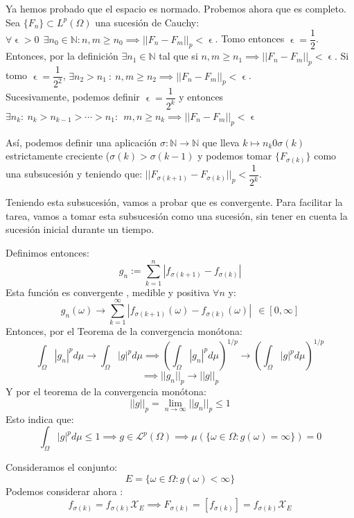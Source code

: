 \documentclass[11pt, a4paper]{article}
\makeatletter
\newif\IfInSansMode
\let\oldsf\sffamily
\renewcommand*{\sffamily}{\oldsf\mathversion{sans}\InSansModetrue}
\let\oldnorm\normalfont
\renewcommand*{\normalfont}{\oldnorm\InSansModefalse\mathversion{normal}}
\let\epsilon\upvarepsilon
\renewenvironment{proof}[1][\proofname] {\par\pushQED{\qed}\normalfont\topsep6\p@\@plus6\p@\relax\trivlist\item[\hskip\labelsep\itshape\sffamily#1\@addpunct{.}]\ignorespaces}{\popQED\endtrivlist\@endpefalse}
\theoremstyle{theorem-style}
\theoremstyle{definition-style}
\theoremstyle{remark-style}
\theoremstyle{example-style}
\makeatother
\begin{document}
\begin{proof}
  Ya hemos probado que el espacio es normado. Probemos ahora que es completo.\\
  
  Sea $\{ F_n\} \subset L^p(\Omega)$ una sucesión de Cauchy: $\forall \epsilon > 0 \ \ \exists n_0 \in \mathbb N : n,m \geq n_0 \implies || F_n - F_m ||_p < \epsilon$.
  Tomo entonces $\epsilon = \dfrac{1}{2}$. Entonces, por la definición $\exists n_1 \in \mathbb N$ tal que si $n,m \geq n_1 \implies || F_n - F_m ||_p < \epsilon $.
  Si tomo $\epsilon = \dfrac{1}{2^2}$, $\exists n_2 > n_1 \ : \ n,m \geq n_2 \implies || F_n - F_m ||_p < \epsilon$.\\
  Sucesivamente, podemos definir $\epsilon= \dfrac{1}{2^k}$ y entonces $\exists n_k : \ n_k > n_{k-1} > \cdots > n_1 : \ \ m,n \geq n_k \implies || F_n - F_m ||_p < \epsilon$
  
  Así, podemos definir una aplicación $\sigma: \mathbb N \to \mathbb N$ que lleva $k \mapsto n_k 0 \sigma(k)$ estrictamente creciente ($\sigma(k) > \sigma(k-1)$ y podemos tomar $\{F_{\sigma(k)}\}$ como una subsucesión y teniendo que: $|| F_{\sigma(k+1)} - F_{\sigma(k)} ||_p < \dfrac{1}{2^k}$.
  
  Teniendo esta subsucesión, vamos a probar que es convergente. Para facilitar la tarea, vamos a tomar esta subsucesión como una sucesión, sin tener en cuenta la sucesión inicial durante un tiempo.
  
  Definimos entonces:
  \[
    g_n := \sum_{k=1}^n |f_{\sigma(k+1)} - f_{\sigma(k)}|
  \]
  Esta función es convergente , medible y positiva $\forall n$ y:
  \[
    g_n(\omega) \to \sum_{k=1}^\infty |f_{\sigma(k+1)}(\omega) - f_{\sigma(k)}(\omega)| \ \ \in [0,\infty]
  \]
  Entonces, por el Teorema de la convergencia monótona:
  \[
    \int_\Omega |g_n|^p d\mu \to \int_\Omega |g|^p d\mu \implies (\int_\Omega |g_n|^p d\mu)^{1/p} \to (\int_\Omega |g|^p d\mu)^{1/p} 
  \]
  \[
    \implies ||g_n||_p \to ||g||_p
  \]
  Y por el teorema de la convergencia monótona:
  \[
    ||g||_p = \lim_{n\to \infty} ||g_n||_p \leq 1  
  \]
  Esto indica que:
  \[
    \int_\Omega |g|^p d\mu \leq 1 \implies g \in \mathcal L ^p(\Omega) \implies \mu(\{ \omega \in \Omega : g(\omega) = \infty\}) = 0
  \]
  
  Consideramos el conjunto:
  \[
    E = \{ \omega \in \Omega : g(\omega) < \infty\}
  \]	
  Podemos considerar ahora :
  \[
    f_{\sigma(k)} = f_{\sigma(k)} \mathcal X _E \implies F_{\sigma(k)} = [f_{\sigma(k)}] = f_{\sigma(k)} \mathcal X _E
  \]
  

\end{proof}
\end{document}
